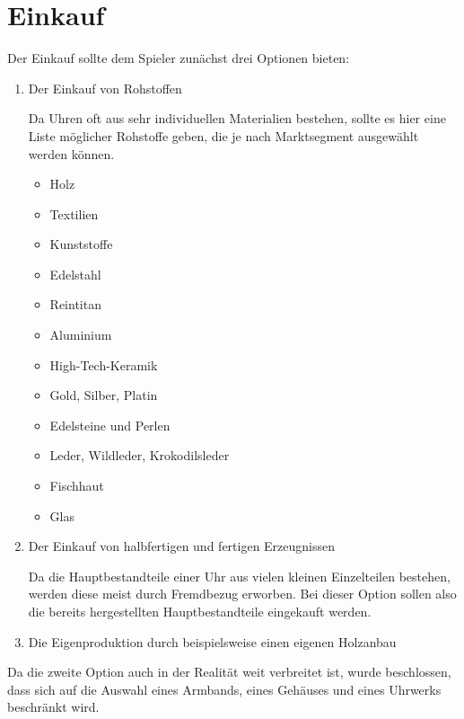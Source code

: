 \section{Einkauf}\label{sec:einkauf}
Der Einkauf sollte dem Spieler zunächst drei Optionen bieten:
\begin{enumerate}
\item Der Einkauf von Rohstoffen \par
Da Uhren oft aus sehr individuellen Materialien bestehen, sollte es hier eine Liste möglicher Rohstoffe geben, die je nach Marktsegment ausgewählt werden können.
\begin{itemize}
\item	Holz	\\
\item	Textilien	\\
\item	Kunststoffe	\\
\item	Edelstahl \\
\item	Reintitan \\
\item	Aluminium \\
\item	High-Tech-Keramik \\
\item	Gold, Silber, Platin
\item Edelsteine und Perlen \\
\item Leder, Wildleder, Krokodilsleder \\
\item	Fischhaut
\item	Glas \\
\end{itemize}
\item Der Einkauf von halbfertigen und fertigen Erzeugnissen \par
Da die Hauptbestandteile einer Uhr aus vielen kleinen Einzelteilen bestehen, werden diese meist durch Fremdbezug erworben. Bei dieser Option sollen also die bereits hergestellten Hauptbestandteile eingekauft werden.
\item Die Eigenproduktion durch beispielsweise einen eigenen Holzanbau
\end{enumerate}

Da die zweite Option auch in der Realität weit verbreitet ist, wurde beschlossen, dass sich auf die Auswahl eines Armbands, eines Gehäuses und eines Uhrwerks beschränkt wird.


